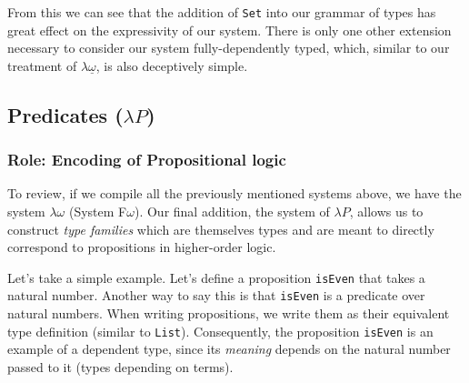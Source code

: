 \documentclass[12pt]{article}
\begin{document}
From this we can see that the addition of {\tt Set} into our grammar of
types has great effect on the expressivity of our system. There is only one
other extension necessary to consider our system fully-dependently typed, which,
similar to our treatment of \(\lambda\underline{\omega}\), is also deceptively
simple.

\subsection*{Predicates (\(\lambda P\))}
\subsubsection*{Role: Encoding of Propositional logic}

To review, if we compile all the previously mentioned systems above, we have
the system \(\lambda\omega\) (System F\(\omega\)). Our final addition, the
system of \(\lambda P\), allows us to construct {\em type families} which are
themselves types and are meant to directly correspond to propositions in
higher-order logic.

Let's take a simple example. Let's define a proposition {\tt isEven} that takes
a natural number. Another way to say this is that {\tt isEven} is a predicate
over natural numbers. When writing propositions, we write them as their equivalent
type definition (similar to {\tt List}). Consequently, the proposition
{\tt isEven} is an example of a dependent type, since its {\em meaning} depends
on the natural number passed to it (types depending on terms).
\end{document}
